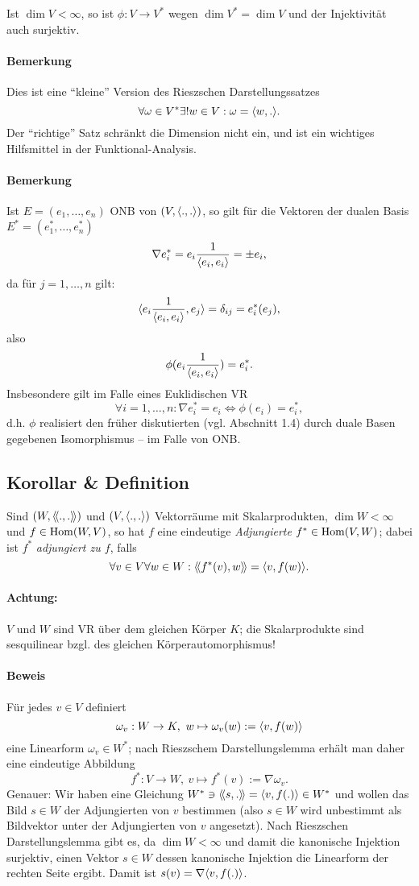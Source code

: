 	Ist $ \dim V <\infty $, so ist $ \phi:V\to V^* $ wegen $ \dim V^* = \dim V $ und der Injektivität auch surjektiv.
\paragraph{Bemerkung}
	Dies ist eine "`kleine"' Version des Rieszschen Darstellungssatzes
	\[ \forall \omega\in V^*\exists! w\in V: \omega = \langle w,. \rangle. \]
	Der "`richtige"' Satz schränkt die Dimension nicht ein, und ist ein wichtiges Hilfsmittel in der Funktional-Analysis.
\paragraph{Bemerkung}
	Ist $ E = (e_1,\dots,e_n) $ ONB von $ (V,\langle .,. \rangle) $, so gilt für die Vektoren der dualen Basis $ E^* = (e_1^*,\dots,e_n^*) $
		\[ \nabla e_i^* = e_i\frac{1}{\langle e_i,e_i \rangle} = \pm e_i, \]
	da für $ j=1,\dots,n $ gilt:
		\[ \langle e_i\frac{1}{\langle e_i,e_i \rangle},e_j \rangle = \delta_{ij} = e_i^*(e_j), \]
	also
		\[ \phi(e_i\frac{1}{\langle e_i,e_i \rangle}) = e_i^*. \]
	Insbesondere gilt im Falle eines Euklidischen VR
		\[ \forall i=1,\dots,n: \nabla e_i^* = e_i \Leftrightarrow \phi(e_i)= e_i^*, \]
	d.h. $ \phi $ realisiert den früher diskutierten (vgl. Abschnitt 1.4) durch duale Basen gegebenen
	Isomorphismus -- im Falle von ONB.

\subsection{Korollar \& Definition}
\begin{Definition}[Adjungierte]
	Sind $ (W,\langle\! \langle .,. \rangle\! \rangle) $ und $ (V,\langle .,. \rangle) $ Vektorräume mit Skalarprodukten, $ \dim W < \infty $ und $ f\in \operatorname{Hom}(W,V) $, so hat $ f $ eine eindeutige \emph{Adjungierte} $ f^* \in \operatorname{Hom}(V,W) $;
	dabei ist $ f^* $ \emph{adjungiert zu $ f $}, falls
		\[ \forall v\in V\forall w\in W: \langle\! \langle f^*(v),w \rangle\! \rangle = \langle v,f(w) \rangle. \]
\end{Definition}
\paragraph{Achtung:}
$ V $ und $ W $ sind VR über dem gleichen Körper $ K $; die Skalarprodukte sind sesquilinear bzgl. des gleichen Körperautomorphismus!
\paragraph{Beweis}
	Für jedes $ v\in V $ definiert
		\[ \omega_v:W\to K,\ w\mapsto \omega_v(w) := \langle v,f(w) \rangle \]
	eine Linearform $ \omega_v\in W^* $; nach Rieszschem Darstellungslemma erhält man daher eine eindeutige Abbildung 
		\[ f^*:V\to W,\ v\mapsto f^*(v):= \nabla \omega_v. \]
	Genauer: Wir haben eine Gleichung $W^*\ni\langle\! \langle s,. \rangle\! \rangle = \langle v,f(.) \rangle\in W^*$ und wollen das Bild $s\in W$ der Adjungierten von $v$ bestimmen (also $s\in W$ wird unbestimmt als Bildvektor unter der Adjungierten von $v$ angesetzt).
	Nach Rieszschen Darstellungslemma gibt es, da $\dim W<\infty$ und damit die kanonische Injektion surjektiv, einen Vektor $s\in W$ dessen kanonische Injektion die Linearform der rechten Seite ergibt.
	Damit ist $s(v)=\nabla\langle v,f(.) \rangle$.
	
